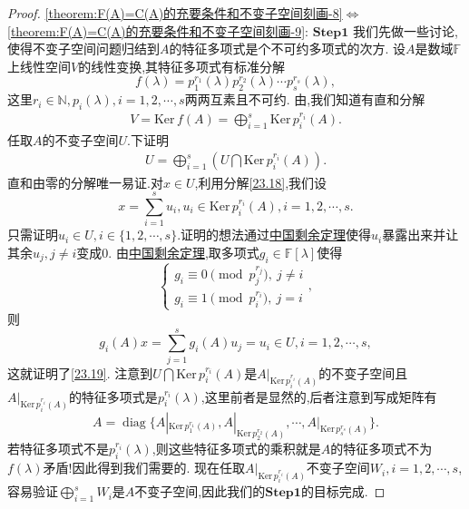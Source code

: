 \documentclass[../../main.tex]{subfiles}%
\begin{document}
\begin{proof}
\noindent\ref{theorem:F(A)=C(A)的充要条件和不变子空间刻画-8}$\Leftrightarrow$ \ref{theorem:F(A)=C(A)的充要条件和不变子空间刻画-9}:
$\mathbf{Step}\mathbf{1}$ 我们先做一些讨论,使得不变子空间问题归结到$A$的特征多项式是个不可约多项式的次方.
设$A$是数域$\mathbb{F}$上线性空间$V$的线性变换,其特征多项式有标准分解
$$f(\lambda)=p_1^{r_1}(\lambda)p_2^{r_2}(\lambda)\cdots p_s^{r_s}(\lambda),$$
这里$r_i\in\mathbb{N},p_i(\lambda),i=1,2,\cdots,s$两两互素且不可约.
由,我们知道有直和分解
\begin{align}
V=\text{Ker}\, f(A)=\bigoplus_{i=1}^s\text{Ker}\, p_i^{r_i}(A)\label{23.18}.
\end{align}
任取$A$的不变子空间$U$.下证明
\begin{align}
U=\bigoplus_{i=1}^s\left(U\bigcap\text{Ker}\, p_i^{r_i}(A)\right)\label{23.19}.
\end{align}
直和由零的分解唯一易证.对$x\in U$,利用分解\eqref{23.18},我们设
$$x=\sum_{i=1}^su_i,u_i\in\text{Ker}\, p_i^{r_i}(A),i=1,2,\cdots,s.$$
只需证明$u_i\in U,i\in\{1,2,\cdots,s\}$.证明的想法通过\hyperref[theorem:中国剩余定理(多项式版)]{中国剩余定理}使得$u_i$暴露出来并让其余$u_j,j\neq i$变成$0$.
由\hyperref[theorem:中国剩余定理(多项式版)]{中国剩余定理},取多项式$g_i\in\mathbb{F}[\lambda]$使得
$$\begin{cases}g_i\equiv0\pmod{p_j^{r_j}},\ j\neq i\\g_i\equiv1\pmod{p_i^{r_i}},\ j=i\end{cases},$$
则
$$g_i(A)x=\sum_{j=1}^sg_i(A)u_j=u_i\in U,i=1,2,\cdots,s,$$
这就证明了\eqref{23.19}.
注意到$U\bigcap\text{Ker}\, p_i^{r_i}(A)$是$A|_{\text{Ker}\, p_i^{r_i}(A)}$的不变子空间且$A|_{\text{Ker}\, p_i^{r_i}(A)}$的特征多项式是$p_i^{r_i}(\lambda)$,这里前者是显然的,后者注意到写成矩阵有
$$A=\operatorname{diag}\{A|_{\text{Ker}\, p_1^{r_1}(A)},A|_{\text{Ker}\, p_2^{r_2}(A)},\cdots,A|_{\text{Ker}\, p_s^{r_s}(A)}\}.$$
若特征多项式不是$p_i^{r_i}(\lambda)$,则这些特征多项式的乘积就是$A$的特征多项式不为$f(\lambda)$矛盾!因此得到我们需要的.
现在任取$A|_{\text{Ker}\, p_i^{r_i}(A)}$不变子空间$W_i,i=1,2,\cdots,s$,容易验证$\bigoplus_{i=1}^sW_i$是$A$不变子空间,因此我们的$\mathbf{Step}\mathbf{1}$的目标完成.


\end{proof}
\end{document}
